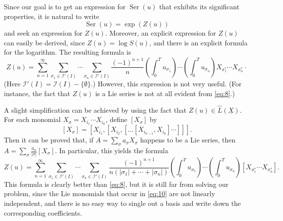 \documentclass[leqno]{article}
\theoremstyle{plain}
\newcommand{\Ser}{\operatorname{Ser}}
\begin{document}
Since our goal is to get an expression for $\Ser(u)$ that exhibits its significant properties, it is natural to write
\begin{equation}
	\Ser(u)=\exp (Z(u))
\end{equation}
and seek an expression for $Z(u)$. Moreover, an explicit expression for $Z(u)$ can easily be derived, since $Z(u)=\log S(u)$, and there is an explicit formula for the logarithm. The resulting formula is
\begin{equation} \label{eq:8}
	Z(u)=\sum_{n=1}^{\infty} \sum_{\sigma_{1} \in \mathcal{I}'(I)} \cdots \sum_{\sigma_{n} \in \mathcal{I}'(I)} \frac{(-1)^{n+1}}{n}\left(\int_{0}^{T} u_{\sigma_{1}}\right) \cdots\left(\int_{0}^{T} u_{\sigma_{n}}\right) X_{\sigma_{1}^{*}} \cdots X_{\sigma_{n}^{*}} \cdot
\end{equation}
(Here $\mathcal{I}'(I)=\mathcal{I}(I)-\{\emptyset\}.$) 
However, this expression is not very useful. 
(For instance, the fact that $Z(u)$ is a Lie series is not at all evident from \eqref{eq:8}.)

A slight simplification can be achieved by using the fact that $Z(u) \in \hat{L}(\underline{X})$. For each monomial $X_{\sigma}=X_{i_{1}} \cdots X_{i_{k}}$, define $\left[X_{\sigma}\right]$ by
\begin{equation}
	\left[X_{\sigma}\right]=\left[X_{i_{1}},\left[X_{i_{2}},\left[\ldots\left[X_{i_{k-1}}, X_{i_{k}}\right] \cdots\right]\right]\right].
\end{equation}
Then it can be proved that, if $A=\sum_{\sigma} a_{\sigma} X_{\sigma}$ happens to be a Lie series, then $A=\sum_{\sigma} \frac{a_{\sigma}}{|\sigma|}\left[X_{\sigma}\right]$. In particular, this yields the formula
\begin{equation} \label{eq:10}
	Z(u)=\sum_{n=1}^{\infty} \sum_{\sigma_{1} \in \mathcal{I}'(I)} \cdots \sum_{\sigma_{n} \in \mathcal{I}'(I)} \frac{(-1)^{n+1}}{n(|\sigma_1|+ \dotsb +|\sigma_n|)}\left(\int_{0}^{T} u_{\sigma_{1}}\right) \cdots\left(\int_{0}^{T} u_{\sigma_{n}}\right) [X_{\sigma_{1}^{*}} \cdots X_{\sigma_{n}^{*}}].
\end{equation}
This formula is clearly better than \eqref{eq:8}, but it is still far from solving our problem, since the Lie monomials that occur in \eqref{eq:10} are not linearly independent, and there is no easy way to single out a basis and write down the corresponding coefficients.
\end{document}
